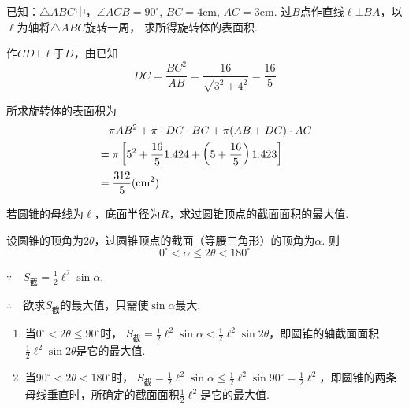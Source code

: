 \begin{example}
    已知：$\triangle ABC$中，$\angle ACB=90^{\circ}$, $BC=4$cm, $AC
=3$cm. 过$B$点作直线$\ell\bot BA$，以$\ell$为轴将$\triangle ABC$旋转一周，
求所得旋转体的表面积.
\end{example}

\begin{solution}
作$CD\bot \ell$于$D$，由已知
\[DC=\frac{BC^2}{AB}=\frac{16}{\sqrt{3^2+4^2}}=\frac{16}{5}\]

\noindent
\begin{minipage}{.63\textwidth}
所求旋转体的表面积为
\[\begin{split}
    &\quad \pi AB^2+\pi \cdot DC\cdot BC+\pi(AB+DC)\cdot AC \\
    &=\pi\left[5^2+\dfrac{16}{5}1.42 4+\left(5+\dfrac{16}{5}\right)1.42 3\right]\\
   & =\dfrac{312}{5}({\rm cm}^2)
\end{split}\]

\end{minipage}
\hfill
\begin{minipage}{.35\textwidth}
\centering
{}
\end{minipage}
\end{solution}

\begin{example}
    若圆锥的母线为$\ell$，底面半径为$R$，求过圆锥顶点的截面面积的最大值.
\end{example}

\begin{solution}
设圆锥的顶角为$2\theta$，过圆锥顶点的截面（等腰三角形）的顶角为$\alpha$. 则$$0^{\circ}<\alpha\le 2\theta<180^{\circ}$$

$\because\quad S_{\text{截}}=\frac{1}{2}\ell^2\sin\alpha$,

$\therefore\quad $欲求$S_{\text{截}}$的最大值，只需使$\sin\alpha$最大.

\begin{enumerate}[(1)]
\item 当$0^{\circ}<2\theta\le 90^{\circ}$时，
$S_{\text{截}}=\frac{1}{2}\ell^2\sin\alpha<\frac{1}{2}\ell^2\sin2\theta$，即圆锥的轴截面面积$\frac{1}{2}\ell^2\sin2\theta$是它的最大值.
\item 当$90^{\circ}<2\theta<180^{\circ}$时，
$S_{\text{截}}=\frac{1}{2}\ell^2\sin\alpha\le \frac{1}{2}\ell^2\sin90^{\circ}=\frac{1}{2}\ell^2$，即圆锥的两条母线垂直时，所确定的截面面积$\frac{1}{2}\ell^2$是它的最大值.
\end{enumerate}

\end{solution}

